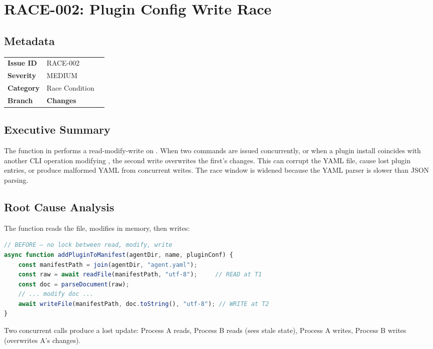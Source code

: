 \section{RACE-002: Plugin Config Write Race}
\label{sec:race-002}
\subsection*{Metadata}
\begin{tabular}{ll}
\textbf{Issue ID} & RACE-002 \\
\textbf{Severity} & MEDIUM \\
\textbf{Category} & Race Condition \\
\textbf{Branch} & 
\textbf{Changes} &  \\
\end{tabular}

\subsection*{Executive Summary}
The  function in  performs a read-modify-write on . When two  commands are issued concurrently, or when a plugin install coincides with another CLI operation modifying , the second write overwrites the first's changes. This can corrupt the YAML file, cause lost plugin entries, or produce malformed YAML from concurrent writes. The race window is widened because the  YAML parser is slower than JSON parsing.

\subsection*{Root Cause Analysis}
The function reads the file, modifies in memory, then writes:

\begin{lstlisting}[language=TypeScript]
// BEFORE — no lock between read, modify, write
async function addPluginToManifest(agentDir, name, pluginConf) {
    const manifestPath = join(agentDir, "agent.yaml");
    const raw = await readFile(manifestPath, "utf-8");     // READ at T1
    const doc = parseDocument(raw);
    // ... modify doc ...
    await writeFile(manifestPath, doc.toString(), "utf-8"); // WRITE at T2
}
\end{lstlisting}

Two concurrent calls produce a lost update: Process A reads, Process B reads (sees stale state), Process A writes, Process B writes (overwrites A's changes).


